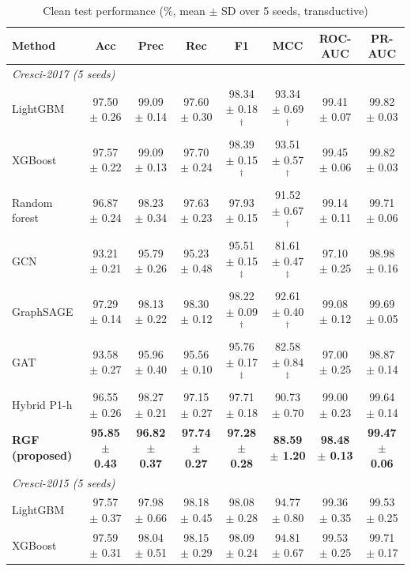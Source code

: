 \begin{table}[!t]
\caption{Clean test performance (\%, mean $\pm$ SD over 5 seeds, transductive)}
\label{tab:clean_performance}
\centering\footnotesize
\setlength{\tabcolsep}{3pt}
\begin{tabular}{lccccccc}
\hline
Method & Acc & Prec & Rec & F1 & MCC & ROC-AUC & PR-AUC \\
\hline
\multicolumn{8}{l}{\textit{Cresci-2017 (5 seeds)}} \\
LightGBM & 97.50 $\pm$ 0.26 & 99.09 $\pm$ 0.14 & 97.60 $\pm$ 0.30 & 98.34 $\pm$ 0.18$^\dagger$ & 93.34 $\pm$ 0.69$^\dagger$ & 99.41 $\pm$ 0.07 & 99.82 $\pm$ 0.03 \\
XGBoost & 97.57 $\pm$ 0.22 & 99.09 $\pm$ 0.13 & 97.70 $\pm$ 0.24 & 98.39 $\pm$ 0.15$^\dagger$ & 93.51 $\pm$ 0.57$^\dagger$ & 99.45 $\pm$ 0.06 & 99.82 $\pm$ 0.03 \\
Random forest & 96.87 $\pm$ 0.24 & 98.23 $\pm$ 0.34 & 97.63 $\pm$ 0.23 & 97.93 $\pm$ 0.15 & 91.52 $\pm$ 0.67$^\dagger$ & 99.14 $\pm$ 0.11 & 99.71 $\pm$ 0.06 \\
GCN & 93.21 $\pm$ 0.21 & 95.79 $\pm$ 0.26 & 95.23 $\pm$ 0.48 & 95.51 $\pm$ 0.15$^\ddagger$ & 81.61 $\pm$ 0.47$^\ddagger$ & 97.10 $\pm$ 0.25 & 98.98 $\pm$ 0.16 \\
GraphSAGE & 97.29 $\pm$ 0.14 & 98.13 $\pm$ 0.22 & 98.30 $\pm$ 0.12 & 98.22 $\pm$ 0.09$^\dagger$ & 92.61 $\pm$ 0.40$^\dagger$ & 99.08 $\pm$ 0.12 & 99.69 $\pm$ 0.05 \\
GAT & 93.58 $\pm$ 0.27 & 95.96 $\pm$ 0.40 & 95.56 $\pm$ 0.10 & 95.76 $\pm$ 0.17$^\ddagger$ & 82.58 $\pm$ 0.84$^\ddagger$ & 97.00 $\pm$ 0.25 & 98.87 $\pm$ 0.14 \\
Hybrid P1-h & 96.55 $\pm$ 0.26 & 98.27 $\pm$ 0.21 & 97.15 $\pm$ 0.27 & 97.71 $\pm$ 0.18 & 90.73 $\pm$ 0.70 & 99.00 $\pm$ 0.23 & 99.64 $\pm$ 0.14 \\
\textbf{RGF (proposed)} & \textbf{95.85 $\pm$ 0.43} & \textbf{96.82 $\pm$ 0.37} & \textbf{97.74 $\pm$ 0.27} & \textbf{97.28 $\pm$ 0.28} & \textbf{88.59 $\pm$ 1.20} & \textbf{98.48 $\pm$ 0.13} & \textbf{99.47 $\pm$ 0.06} \\
\multicolumn{8}{l}{\textit{Cresci-2015 (5 seeds)}} \\
LightGBM & 97.57 $\pm$ 0.37 & 97.98 $\pm$ 0.66 & 98.18 $\pm$ 0.45 & 98.08 $\pm$ 0.28 & 94.77 $\pm$ 0.80 & 99.36 $\pm$ 0.35 & 99.53 $\pm$ 0.25 \\
XGBoost & 97.59 $\pm$ 0.31 & 98.04 $\pm$ 0.51 & 98.15 $\pm$ 0.29 & 98.09 $\pm$ 0.24 & 94.81 $\pm$ 0.67 & 99.53 $\pm$ 0.25 & 99.71 $\pm$ 0.17 \\

\end{tabular}
\end{table}
